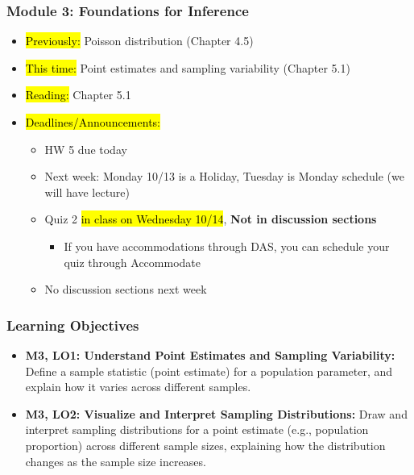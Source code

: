 
\begin{frame}
    \frametitle{Module 3: Foundations for Inference}
    \begin{itemize}
        \item \hl{Previously: }Poisson distribution (Chapter 4.5)
        \item \hl{This time: }Point estimates and sampling variability (Chapter 5.1)
        \item \hl{Reading: }Chapter 5.1
        \item \hl{Deadlines/Announcements: }
        \begin{itemize}
            \item HW 5 due today
            \item Next week: Monday 10/13 is a Holiday, Tuesday is Monday schedule (we will have lecture)
            \item Quiz 2 \hl{in class on Wednesday 10/14}, \textbf{Not in discussion sections}
            \begin{itemize}
                \item If you have accommodations through DAS, you can schedule your quiz through Accommodate
            \end{itemize}
            \item No discussion sections next week
        \end{itemize}
    \end{itemize}

\end{frame}

\begin{frame}
    \frametitle{Learning Objectives}
    \begin{itemize}
        \item \textbf{M3, LO1: Understand Point Estimates and Sampling Variability:} Define a sample statistic (point estimate) for a population parameter, and explain how it varies across different samples.
        \item \textbf{M3, LO2: Visualize and Interpret Sampling Distributions:} Draw and interpret sampling distributions for a point estimate (e.g., population proportion) across different sample sizes, explaining how the distribution changes as the sample size increases.
    \end{itemize}
\end{frame}
